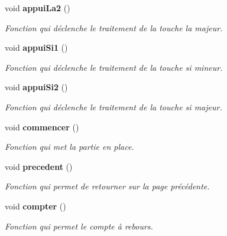 \begin{DoxyCompactItemize}
void {\bf appui\-La2} ()
\begin{DoxyCompactList}\small\item\em Fonction qui déclenche le traitement de la touche la majeur. \end{DoxyCompactList}\item 
void {\bf appui\-Si1} ()
\begin{DoxyCompactList}\small\item\em Fonction qui déclenche le traitement de la touche si mineur. \end{DoxyCompactList}\item 
void {\bf appui\-Si2} ()
\begin{DoxyCompactList}\small\item\em Fonction qui déclenche le traitement de la touche si majeur. \end{DoxyCompactList}\item 
void {\bf commencer} ()
\begin{DoxyCompactList}\small\item\em Fonction qui met la partie en place. \end{DoxyCompactList}\item 
void {\bf precedent} ()
\begin{DoxyCompactList}\small\item\em Fonction qui permet de retourner sur la page précédente. \end{DoxyCompactList}\item 
void {\bf compter} ()
\begin{DoxyCompactList}\small\item\em Fonction qui permet le compte à rebours. \end{DoxyCompactList}\end{DoxyCompactItemize}
